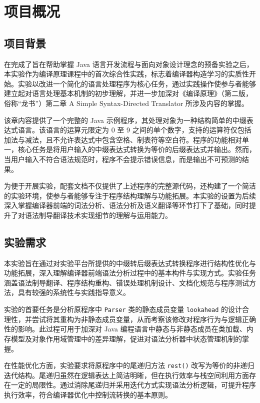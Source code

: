 \documentclass[a4paper, twoside, utf8]{ctexart}
\begin{document}
    \section{项目概况}

    \subsection{项目背景}

    在完成了旨在帮助掌握 Java 语言开发流程与面向对象设计理念的预备实验之后，本实验作为编译原理课程中的首次综合性实践，标志着编译器构造学习的实质性开始。实验以改进一个简化的语言处理程序为核心任务，通过实践操作使参与者能够建立起对语言处理基本机制的初步理解，并进一步加深对《编译原理》（第二版，俗称“龙书”）第二章 A Simple Syntax-Directed Translator 所涉及内容的掌握。

    该章内容提供了一个完整的 Java 示例程序，其处理对象为一种结构简单的中缀表达式语言。该语言的运算元限定为 0 至 9 之间的单个数字，支持的运算符仅包括加法与减法，且不允许表达式中包含空格、制表符等空白符。程序的功能相对单一，核心任务是将用户输入的中缀表达式转换为等价的后缀表达式并输出。然而，当用户输入不符合语法规范时，程序不会提示错误信息，而是输出不可预测的结果。

    为便于开展实验，配套文档不仅提供了上述程序的完整源代码，还构建了一个简洁的实验环境，使参与者能够专注于程序结构理解与功能拓展。本实验的设置为后续深入掌握编译器前端的词法分析、语法分析及语义翻译等环节打下了基础，同时提升了对语法制导翻译技术实现细节的理解与运用能力。

    \subsection{实验需求}

    本实验旨在通过对实验平台所提供的中缀转后缀表达式转换程序进行结构性优化与功能拓展，深入理解编译器前端语法分析过程中的基本构件与实现方式。实验任务涵盖语法制导翻译、程序结构重构、错误处理机制设计、文档化规范与程序测试方法，具有较强的系统性与实践指导意义。

    实验的首要任务是分析原程序中 \verb|Parser| 类的静态成员变量 \verb|lookahead| 的设计合理性，并尝试将其重构为非静态成员变量，从而考察该修改对程序行为与逻辑正确性的影响。此过程可用于加深对 Java 编程语言中静态与非静态成员在类加载、内存模型及对象作用域管理中的差异理解，促进对语法分析器中状态管理机制的掌握。
    
    在性能优化方面，实验要求将原程序中的尾递归方法 \verb|rest()| 改写为等价的非递归迭代结构。尾递归虽然在逻辑表达上简洁明晰，但在执行效率与栈空间利用方面存在一定的局限性。通过消除尾递归并采用迭代方式实现语法分析逻辑，可提升程序执行效率，符合编译器优化中控制流转换的基本原则。
    
\end{document}
